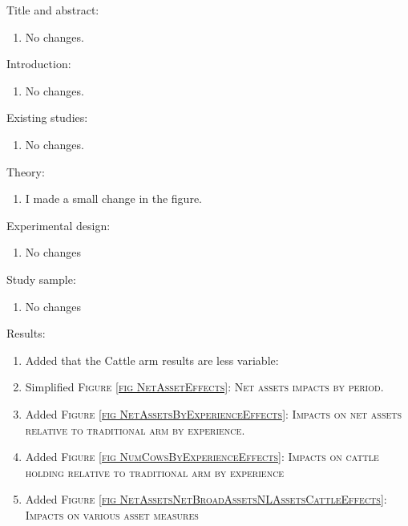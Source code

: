 \vspace{2ex}
Title and abstract:
\begin{enumerate}
\vspace{1.0ex}\setlength{\itemsep}{1.0ex}\setlength{\baselineskip}{12pt}
\item	No changes.
\end{enumerate}
Introduction:
\begin{enumerate}
\vspace{1.0ex}\setlength{\itemsep}{1.0ex}\setlength{\baselineskip}{12pt}
\item	No changes.
\end{enumerate}
Existing studies:
\begin{enumerate}
\vspace{1.0ex}\setlength{\itemsep}{1.0ex}\setlength{\baselineskip}{12pt}
\item	No changes.
\end{enumerate}
Theory:
\begin{enumerate}
\vspace{1.0ex}\setlength{\itemsep}{1.0ex}\setlength{\baselineskip}{12pt}
\item	I made a small change in the figure. 
\end{enumerate}
Experimental design:
\begin{enumerate}
\vspace{1.0ex}\setlength{\itemsep}{1.0ex}\setlength{\baselineskip}{12pt}
\item	No changes
\end{enumerate}
Study sample:
\begin{enumerate}
\vspace{1.0ex}\setlength{\itemsep}{1.0ex}\setlength{\baselineskip}{12pt}
\item	No changes
\end{enumerate}
Results: 
\begin{enumerate}
\vspace{1.0ex}\setlength{\itemsep}{1.0ex}\setlength{\baselineskip}{12pt}
\item	Added that the \textsf{Cattle} arm results are less variable:
\item	Simplified \textsc{\footnotesize Figure \ref{fig NetAssetEffects}: Net assets impacts by period}.
\item	Added \textsc{\footnotesize Figure \ref{fig NetAssetsByExperienceEffects}: Impacts on net assets relative to traditional arm by experience}.
\item	Added \textsc{\footnotesize Figure \ref{fig NumCowsByExperienceEffects}: Impacts on cattle holding relative to traditional arm by experience}
\item	Added \textsc{\footnotesize Figure \ref{fig NetAssetsNetBroadAssetsNLAssetsCattleEffects}: Impacts on various asset measures}
\end{enumerate}
